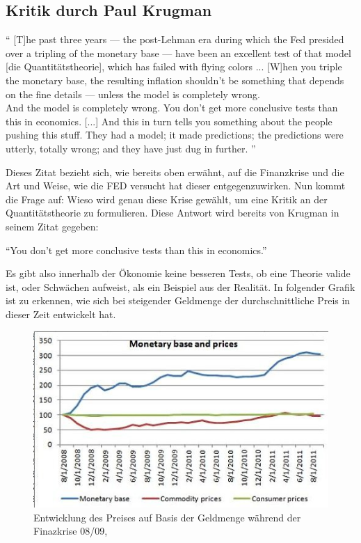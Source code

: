 \subsection{Kritik durch Paul Krugman}

\enquote{
[T]he past three years — the post-Lehman era during which the Fed presided over a tripling of the monetary base — have been an excellent test of that model [die Quantitätstheorie], which has failed with flying colors ... [W]hen you triple the monetary base, the resulting inflation shouldn’t be something that depends on the fine details — unless the model is completely wrong.\\
And the model is completely wrong. You don’t get more conclusive tests than this in economics. [...] 
And this in turn tells you something about the people pushing this stuff. They had a model; it made predictions; the predictions were utterly, totally wrong; and they have just dug in further.
}\autocite{Krugman2011} 

Dieses Zitat bezieht sich, wie bereits oben erwähnt, auf die Finanzkrise und die Art und Weise, wie die FED versucht hat dieser entgegenzuwirken. Nun kommt die Frage auf: Wieso wird genau diese Krise gewählt, um eine Kritik an der Quantitätstheorie zu formulieren. Diese Antwort wird bereits von Krugman in seinem Zitat gegeben:
\begin{center}
    \enquote{You don’t get more conclusive tests than this in economics.}
\end{center}

Es gibt also innerhalb der Ökonomie keine besseren Tests, ob eine Theorie valide ist, oder Schwächen aufweist, als ein Beispiel aus der Realität. In folgender Grafik ist zu erkennen, wie sich bei steigender Geldmenge der durchschnittliche Preis in dieser Zeit entwickelt hat.

\begin{figure}[H]
    \centering
    \includegraphics{img/100711krugman3-blog480.jpg}
    \caption{Entwicklung des Preises auf Basis der Geldmenge während der Finazkrise 08/09, \cite{Krugman2011}}
\end{figure}    


